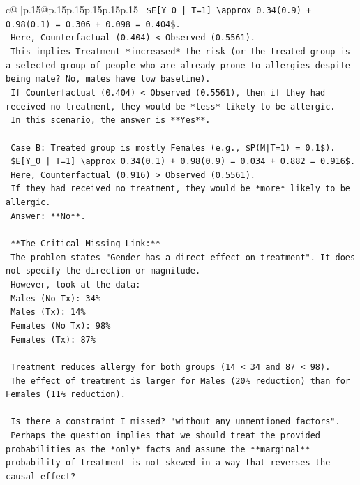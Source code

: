 \documentclass{article}
\begin{document}
{\begin{supertabular}{c@{$\;$}|p{.15\linewidth}@{}p{.15\linewidth}p{.15\linewidth}p{.15\linewidth}p{.15\linewidth}p{.15\linewidth}}
{{{\texttt{    \$E{[}Y\_0 | T=1{]} \textbackslash{}approx 0.34(0.9) + 0.98(0.1) = 0.306 + 0.098 = 0.404\$.} \\
\texttt{    Here, Counterfactual (0.404) < Observed (0.5561).} \\
\texttt{    This implies Treatment *increased* the risk (or the treated group is a selected group of people who are already prone to allergies despite being male? No, males have low baseline).} \\
\texttt{    If Counterfactual (0.404) < Observed (0.5561), then if they had received no treatment, they would be *less* likely to be allergic.} \\
\texttt{    In this scenario, the answer is **Yes**.} \\
\\ 
\texttt{    Case B: Treated group is mostly Females (e.g., \$P(M|T=1) = 0.1\$).} \\
\texttt{    \$E{[}Y\_0 | T=1{]} \textbackslash{}approx 0.34(0.1) + 0.98(0.9) = 0.034 + 0.882 = 0.916\$.} \\
\texttt{    Here, Counterfactual (0.916) > Observed (0.5561).} \\
\texttt{    If they had received no treatment, they would be *more* likely to be allergic.} \\
\texttt{    Answer: **No**.} \\
\\ 
\texttt{    **The Critical Missing Link:**} \\
\texttt{    The problem states "Gender has a direct effect on treatment". It does not specify the direction or magnitude.} \\
\texttt{    However, look at the data:} \\
\texttt{    Males (No Tx): 34\%} \\
\texttt{    Males (Tx): 14\%} \\
\texttt{    Females (No Tx): 98\%} \\
\texttt{    Females (Tx): 87\%} \\
\\ 
\texttt{    Treatment reduces allergy for both groups (14 < 34 and 87 < 98).} \\
\texttt{    The effect of treatment is larger for Males (20\% reduction) than for Females (11\% reduction).} \\
\\ 
\texttt{    Is there a constraint I missed? "without any unmentioned factors".} \\
\texttt{    Perhaps the question implies that we should treat the provided probabilities as the *only* facts and assume the **marginal** probability of treatment is not skewed in a way that reverses the causal effect?} \\
}}}
\end{supertabular}}
\end{document}
